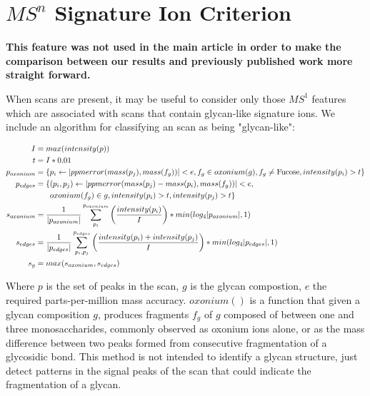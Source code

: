 \section{$MS^n$ Signature Ion Criterion}\label{sec:signature_ion_criterion}
    \textbf{This feature was not used in the main article in order to make the comparison
    between our results and previously published work more straight forward.}

    When \msn scans are present, it  may be useful to consider only those $MS^1$
    features which are associated with \msn scans that contain glycan-like signature
    ions. We include an algorithm for classifying an \msn scan as being "glycan-like":

    \begin{align}
        I &= max(intensity(p)) \\
        t &= I * 0.01 \\
        p_{oxonium} &= \{p_i \leftarrow |ppmerror(mass(p_j), mass(f_g))| < e,
                         f_g \in oxonium(g), f_g \ne \text{Fucose}, intensity(p_i) > t\}\\
        p_{edges} &= \{(p_i, p_j) \leftarrow |ppmerror(mass(p_j) - mass(p_i), mass(f_g))| < e,\\
                  &\phantom{{}=1} oxonium(f_g) \in g , intensity(p_i) > t, intensity(p_j) > t\} \notag\\
        s_{oxonium} &= \frac{1}{|p_{oxonium}|}\sum_{p_i}^{p_{oxonium}}{
                \left(\frac{intensity(p_i)}{I}\right)
            } * min(log_4|p_{oxonium}|, 1)\\
        s_{edges} &= \frac{1}{|p_{edges}|}\sum_{p_i, p_j}^{p_{edges}}{
                \left(\frac{intensity(p_i) + intensity(p_j)}{I}\right)
            } * min(log_4|p_{edges}|, 1)\\
        s_g &= max(s_{oxonium}, s_{edges})\\
    \end{align}

    Where $p$ is the set of peaks in the scan, $g$ is the glycan compostion, $e$ the
    required parts-per-million mass accuracy. $oxonium()$ is a function that given
    a glycan composition $g$, produces fragments $f_g$ of $g$ composed of between one
    and three monosaccharides, commonly observed as oxonium ions alone, or as the mass
    difference between two peaks formed from consecutive fragmentation of a glycosidic
    bond. This method is not intended to identify a glycan structure, just detect patterns in
    the signal peaks of the \msn scan that could indicate the fragmentation of a glycan.
